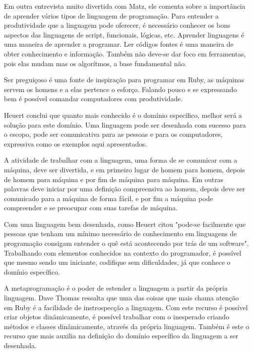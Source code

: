 \documentclass[espaco=simples,appendix=Name]{abnt}
\begin{document}
Em outra entrevista muito divertida \cite{entrevistaDivertidaComMatz} com Matz, ele comenta sobre a importância de aprender vários tipos de linguagem de programação. Para entender a produtividade que a linguagem pode oferecer, é necessário conhecer os bons aspectos das linguagens de script, funcionais, lógicas, etc. Aprender linguagens é uma maneira de aprender a programar. Ler códigos fontes é uma maneira de obter conhecimento e informação. Também não deve-se dar foco em ferramentas, pois elas mudam mas os algorítmos, a base fundamental não. 

Ser preguiçoso é uma fonte de inspiração para programar em Ruby, as máquinas servem os homens e a elas pertence o esforço. Falando pouco e se expressando bem é possível comandar computadores com produtividade.

Heuert\cite{dslLeandro} conclui que quanto mais conhecido é o domínio específico, melhor será a solução para este domínio. Uma linguagem pode ser desenhada com sucesso para o escopo, pode ser comunicativa para as pessoas e para os computadores, expressiva como os exemplos aqui apresentados.

A atividade de trabalhar com a linguagem, uma forma de se comunicar com a máquina, deve ser divertida, e em primeiro lugar de homem para homem, depois de homem para máquina e por fim de máquina para máquina\cite{entrevistaDivertidaComMatz}. Em outras palavras deve iniciar por uma definição compreensiva ao homem, depois deve ser comunicado para a máquina de forma fácil, e por fim a máquina pode compreender e se preocupar com suas tarefas de máquina.


Com uma linguagem bem desenhada, como Heuert citou "pode-se facilmente que pessoas que tenham um mínimo necessário de conhecimento em linguagens de programação consigam entender o quê está acontecendo por trás de um software"\cite{dslLeandro}. Trabalhando com elementos conhecidos na contexto do programador, é possível que mesmo sendo um iniciante, codifique sem dificuldades, já que conhece o domínio específico.

A metaprogramação é o poder de estender a linguagem a partir da própria linguagem. Dave Thomas\cite{programmingRuby} ressalta que uma das coisas que mais chama atenção em Ruby é a facilidade de instrospecção a linguagem. Com este recurso é possível criar objetos dinâmicamente, é possível trabalhar com o inesperado criando métodos e classes dinâmicamente, através da própria linguagem. Também é este o recurso que mais auxilia na definição do domínio específico da linguagem a ser desenhada. 
\end{document}
